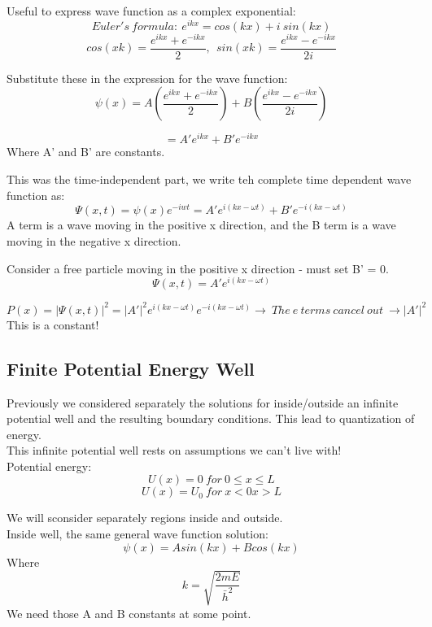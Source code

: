 \documentclass[class=article,crop=false]{standalone}
\begin{document}
Useful to express wave function as a complex exponential:
$$ Euler's\ formula:\ e^{ikx} = cos(kx) + i\ sin(kx)$$
$$ cos(xk) = \frac{e^{ikx} + e^{-ikx}}{2},\ \  sin(xk) = \frac{e^{ikx} - e^{-ikx}}{2i} $$

Substitute these in the expression for the wave function:
$$ \psi(x) = A\left(\frac{e^{ikx} + e^{-ikx}}{2}\right) + B\left(\frac{e^{ikx} - e^{-ikx}}{2i}\right) $$

$$ = A' e^{ikx} + B' e^{-ikx} $$ Where A' and B' are constants.

This was the time-independent part, we write teh complete time dependent wave function as:
$$ \Psi(x,t) = \psi(x) e^{-iwt} = A' e^{i(kx-\omega t)} + B' e^{-i(kx-\omega t)} $$
A term is a wave moving in the positive x direction, and the B term is a wave moving in the negative x direction.

\begin{question}
	Consider a free particle moving in the positive x direction - must set B' = 0.
	$$ \Psi(x,t) = A' e^{i(kx-\omega t)} $$

	\begin{answer}
		$$ P(x) = |\Psi(x,t)|^2 = |A'|^2 e^{i(kx - \omega t)} e^{-i(kx - \omega t)} \rightarrow \ The \ e\  terms\  cancel\  out\ \rightarrow |A'|^2 $$
		This is a constant!
	\end{answer}
\end{question}

\subsection{Finite Potential Energy Well}
Previously we considered separately the solutions for inside/outside an infinite potential well and the resulting boundary conditions. This lead to quantization of energy. \\

This infinite potential well rests on assumptions we can't live with! \\

Potential energy:
$$ U(x) = 0\ for\ 0\leq x\leq L $$
$$ U(x) = U_0\ for\ x < 0 x > L $$

We will sconsider separately regions inside and outside. \\
Inside well, the same general wave function solution:
$$ \psi(x) = A sin(kx) + B cos(kx) $$
Where 
$$ k = \sqrt{\frac{2mE}{\bar{h}^2}} $$
We need those A and B constants at some point. \\
\end{document}
